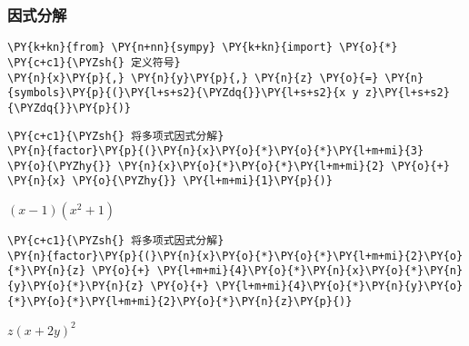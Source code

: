     \hypertarget{ux56e0ux5f0fux5206ux89e3}{%
\subsubsection{因式分解}\label{ux56e0ux5f0fux5206ux89e3}}

    \begin{tcolorbox}[breakable, size=fbox, boxrule=1pt, pad at break*=1mm,colback=cellbackground, colframe=cellborder]
\begin{Verbatim}[commandchars=\\\{\}]
\PY{k+kn}{from} \PY{n+nn}{sympy} \PY{k+kn}{import} \PY{o}{*}
\PY{c+c1}{\PYZsh{} 定义符号}
\PY{n}{x}\PY{p}{,} \PY{n}{y}\PY{p}{,} \PY{n}{z} \PY{o}{=} \PY{n}{symbols}\PY{p}{(}\PY{l+s+s2}{\PYZdq{}}\PY{l+s+s2}{x y z}\PY{l+s+s2}{\PYZdq{}}\PY{p}{)}
\end{Verbatim}
\end{tcolorbox}

    \begin{tcolorbox}[breakable, size=fbox, boxrule=1pt, pad at break*=1mm,colback=cellbackground, colframe=cellborder]
\begin{Verbatim}[commandchars=\\\{\}]
\PY{c+c1}{\PYZsh{} 将多项式因式分解}
\PY{n}{factor}\PY{p}{(}\PY{n}{x}\PY{o}{*}\PY{o}{*}\PY{l+m+mi}{3} \PY{o}{\PYZhy{}} \PY{n}{x}\PY{o}{*}\PY{o}{*}\PY{l+m+mi}{2} \PY{o}{+} \PY{n}{x} \PY{o}{\PYZhy{}} \PY{l+m+mi}{1}\PY{p}{)}
\end{Verbatim}
\end{tcolorbox}
 
            
    
    $\displaystyle \left(x - 1\right) \left(x^{2} + 1\right)$

    

    \begin{tcolorbox}[breakable, size=fbox, boxrule=1pt, pad at break*=1mm,colback=cellbackground, colframe=cellborder]
\begin{Verbatim}[commandchars=\\\{\}]
\PY{c+c1}{\PYZsh{} 将多项式因式分解}
\PY{n}{factor}\PY{p}{(}\PY{n}{x}\PY{o}{*}\PY{o}{*}\PY{l+m+mi}{2}\PY{o}{*}\PY{n}{z} \PY{o}{+} \PY{l+m+mi}{4}\PY{o}{*}\PY{n}{x}\PY{o}{*}\PY{n}{y}\PY{o}{*}\PY{n}{z} \PY{o}{+} \PY{l+m+mi}{4}\PY{o}{*}\PY{n}{y}\PY{o}{*}\PY{o}{*}\PY{l+m+mi}{2}\PY{o}{*}\PY{n}{z}\PY{p}{)}
\end{Verbatim}
\end{tcolorbox}
 
            
    
    $\displaystyle z \left(x + 2 y\right)^{2}$
